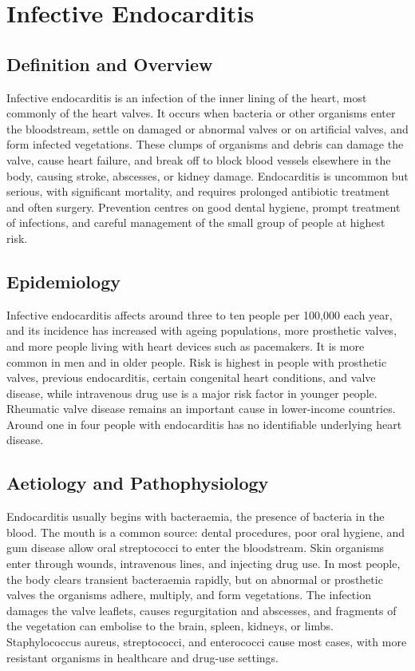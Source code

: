 \chapter{Infective Endocarditis}

\section*{Definition and Overview}
Infective endocarditis is an infection of the inner lining of the heart, most commonly of the heart valves. It occurs when bacteria or other organisms enter the bloodstream, settle on damaged or abnormal valves or on artificial valves, and form infected vegetations. These clumps of organisms and debris can damage the valve, cause heart failure, and break off to block blood vessels elsewhere in the body, causing stroke, abscesses, or kidney damage. Endocarditis is uncommon but serious, with significant mortality, and requires prolonged antibiotic treatment and often surgery. Prevention centres on good dental hygiene, prompt treatment of infections, and careful management of the small group of people at highest risk.

\section*{Epidemiology}
Infective endocarditis affects around three to ten people per 100,000 each year, and its incidence has increased with ageing populations, more prosthetic valves, and more people living with heart devices such as pacemakers. It is more common in men and in older people. Risk is highest in people with prosthetic valves, previous endocarditis, certain congenital heart conditions, and valve disease, while intravenous drug use is a major risk factor in younger people. Rheumatic valve disease remains an important cause in lower-income countries. Around one in four people with endocarditis has no identifiable underlying heart disease.

\section*{Aetiology and Pathophysiology}
Endocarditis usually begins with bacteraemia, the presence of bacteria in the blood. The mouth is a common source: dental procedures, poor oral hygiene, and gum disease allow oral streptococci to enter the bloodstream. Skin organisms enter through wounds, intravenous lines, and injecting drug use. In most people, the body clears transient bacteraemia rapidly, but on abnormal or prosthetic valves the organisms adhere, multiply, and form vegetations. The infection damages the valve leaflets, causes regurgitation and abscesses, and fragments of the vegetation can embolise to the brain, spleen, kidneys, or limbs. Staphylococcus aureus, streptococci, and enterococci cause most cases, with more resistant organisms in healthcare and drug-use settings.


